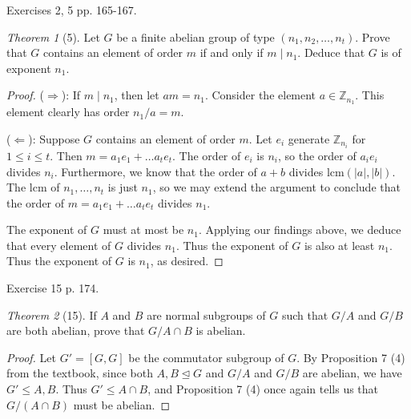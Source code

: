 \documentclass[12pt]{article}
\theoremstyle{remark}
\theoremstyle{named}
\newtheorem*{theorem}{Theorem}
\renewcommand{\implies}{\Rightarrow}
\newcommand{\coimplies}{\Leftarrow}
\newcommand{\normal}{\trianglelefteq}
\begin{document}
Exercises 2, 5 pp. 165-167.

\begin{theorem}[5]
    Let \(G\) be a finite abelian group of type \((n_1, n_2, \dots, n_t)\). Prove that \(G\) contains an element of order \(m\) if and only if \(m \mid n_1\). Deduce that \(G\) is of exponent \(n_1\).
\end{theorem}

\begin{proof}
    (\(\implies\)): If \(m \mid n_1\), then let \(am = n_1\). Consider the element \(a \in \mathbb Z_{n_1}\). This element clearly has order \(n_1 / a = m\).

    (\(\coimplies\)): Suppose \(G\) contains an element of order \(m\). Let \(e_i\) generate \(\mathbb Z_{n_i}\) for \(1 \le i \le t\). Then \(m = a_1 e_1 + \dots a_t e_t\). The order of \(e_i\) is \(n_i\), so the order of \(a_i e_i\) divides \(n_i\). Furthermore, we know that the order of \(a + b\) divides \(\text{lcm}(|a|, |b|)\). The lcm of \(n_1, \dots, n_t\) is just \(n_1\), so we may extend the argument to conclude that the order of \(m = a_1 e_1 + \dots a_t e_t\) divides \(n_1\).

    The exponent of \(G\) must at most be \(n_1\). Applying our findings above, we deduce that every element of \(G\) divides \(n_1\). Thus the exponent of \(G\) is also at least \(n_1\). Thus the exponent of \(G\) is \(n_1\), as desired. 
\end{proof}

Exercise 15 p. 174.

\begin{theorem}[15]
    If \(A\) and \(B\) are normal subgroups of \(G\) such that \(G / A\) and \(G / B\) are both abelian, prove that \(G / A \cap B\) is abelian.
\end{theorem}

\begin{proof}
    Let \(G' = [G, G]\) be the commutator subgroup of \(G\). By Proposition 7 (4) from the textbook, since both \(A, B \normal G\) and \(G / A\) and \(G / B\) are abelian, we have \(G' \le A, B\). Thus \(G' \le A \cap B\), and Proposition 7 (4) once again tells us that \(G / (A \cap B)\) must be abelian.
\end{proof}
\end{document}
